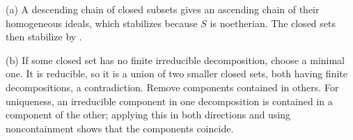 (a) A descending chain of closed subsets gives an ascending chain of their homogeneous ideals, which stabilizes because $S$ is noetherian. The closed sets then stabilize by .

(b) If some closed set has no finite irreducible decomposition, choose a minimal one. It is reducible, so it is a union of two smaller closed sets, both having finite decompositions, a contradiction. Remove components contained in others. For uniqueness, an irreducible component in one decomposition is contained in a component of the other; applying this in both directions and using noncontainment shows that the components coincide.

